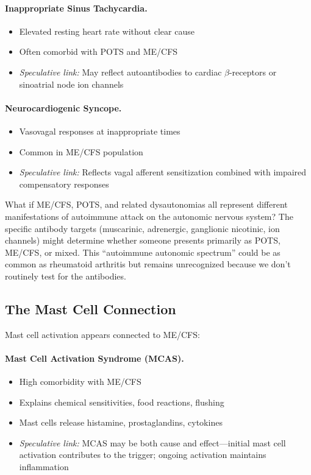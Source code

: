 \paragraph{Inappropriate Sinus Tachycardia.}
\begin{itemize}
    \item Elevated resting heart rate without clear cause
    \item Often comorbid with POTS and ME/CFS
    \item \textit{Speculative link:} May reflect autoantibodies to cardiac $\beta$-receptors or sinoatrial node ion channels
\end{itemize}

\paragraph{Neurocardiogenic Syncope.}
\begin{itemize}
    \item Vasovagal responses at inappropriate times
    \item Common in ME/CFS population
    \item \textit{Speculative link:} Reflects vagal afferent sensitization combined with impaired compensatory responses
\end{itemize}

\begin{open_question}
What if ME/CFS, POTS, and related dysautonomias all represent different manifestations of autoimmune attack on the autonomic nervous system? The specific antibody targets (muscarinic, adrenergic, ganglionic nicotinic, ion channels) might determine whether someone presents primarily as POTS, ME/CFS, or mixed. This ``autoimmune autonomic spectrum'' could be as common as rheumatoid arthritis but remains unrecognized because we don't routinely test for the antibodies.
\end{open_question}

\subsection{The Mast Cell Connection}

Mast cell activation appears connected to ME/CFS:

\paragraph{Mast Cell Activation Syndrome (MCAS).}
\begin{itemize}
    \item High comorbidity with ME/CFS
    \item Explains chemical sensitivities, food reactions, flushing
    \item Mast cells release histamine, prostaglandins, cytokines
    \item \textit{Speculative link:} MCAS may be both cause and effect---initial mast cell activation contributes to the trigger; ongoing activation maintains inflammation
\end{itemize}

